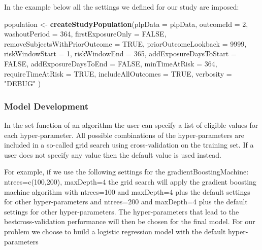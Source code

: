 \documentclass[
]{article}
\newenvironment{Shaded}{\begin{snugshade}}{\end{snugshade}}
\newcommand{\DataTypeTok}[1]{\textcolor[rgb]{0.13,0.29,0.53}{#1}}
\newcommand{\DecValTok}[1]{\textcolor[rgb]{0.00,0.00,0.81}{#1}}
\newcommand{\KeywordTok}[1]{\textcolor[rgb]{0.13,0.29,0.53}{\textbf{#1}}}
\newcommand{\NormalTok}[1]{#1}
\newcommand{\OtherTok}[1]{\textcolor[rgb]{0.56,0.35,0.01}{#1}}
\newcommand{\StringTok}[1]{\textcolor[rgb]{0.31,0.60,0.02}{#1}}
\begin{document}
In the example below all the settings we defined for our study are
imposed:

\begin{Shaded}
\begin{Highlighting}[]
\NormalTok{    population <-}\StringTok{ }\KeywordTok{createStudyPopulation}\NormalTok{(}\DataTypeTok{plpData =}\NormalTok{ plpData,}
                                        \DataTypeTok{outcomeId =} \DecValTok{2}\NormalTok{,}
                                        \DataTypeTok{washoutPeriod =} \DecValTok{364}\NormalTok{,}
                                        \DataTypeTok{firstExposureOnly =} \OtherTok{FALSE}\NormalTok{,}
                                        \DataTypeTok{removeSubjectsWithPriorOutcome =} \OtherTok{TRUE}\NormalTok{,}
                                        \DataTypeTok{priorOutcomeLookback =} \DecValTok{9999}\NormalTok{,}
                                        \DataTypeTok{riskWindowStart =} \DecValTok{1}\NormalTok{,}
                                        \DataTypeTok{riskWindowEnd =} \DecValTok{365}\NormalTok{,}
                                        \DataTypeTok{addExposureDaysToStart =} \OtherTok{FALSE}\NormalTok{,}
                                        \DataTypeTok{addExposureDaysToEnd =} \OtherTok{FALSE}\NormalTok{,}
                                        \DataTypeTok{minTimeAtRisk =} \DecValTok{364}\NormalTok{,}
                                        \DataTypeTok{requireTimeAtRisk =} \OtherTok{TRUE}\NormalTok{,}
                                        \DataTypeTok{includeAllOutcomes =} \OtherTok{TRUE}\NormalTok{,}
                                        \DataTypeTok{verbosity =} \StringTok{"DEBUG"}
\NormalTok{    )}
\end{Highlighting}
\end{Shaded}

\hypertarget{model-development-1}{%
\subsubsection{Model Development}\label{model-development-1}}

In the set function of an algorithm the user can specify a list of
eligible values for each hyper-parameter. All possible combinations of
the hyper-parameters are included in a so-called grid search using
cross-validation on the training set. If a user does not specify any
value then the default value is used instead.

For example, if we use the following settings for the
gradientBoostingMachine: ntrees=c(100,200), maxDepth=4 the grid search
will apply the gradient boosting machine algorithm with ntrees=100 and
maxDepth=4 plus the default settings for other hyper-parameters and
ntrees=200 and maxDepth=4 plus the default settings for other
hyper-parameters. The hyper-parameters that lead to the
bestcross-validation performance will then be chosen for the final
model. For our problem we choose to build a logistic regression model
with the default hyper-parameters
\end{document}
